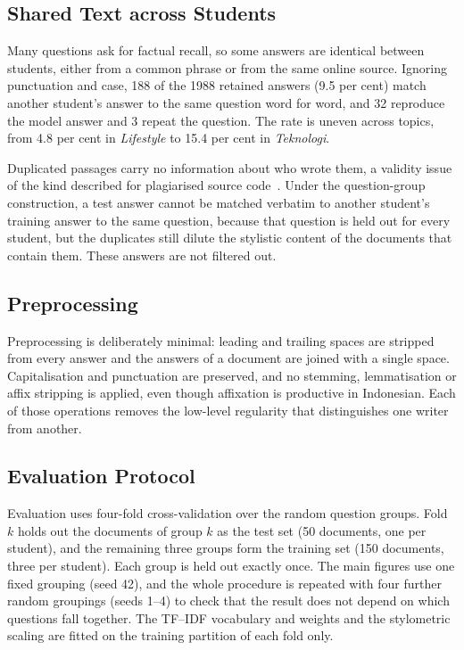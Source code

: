 \documentclass[runningheads]{llncs}
\begin{document}
\subsection{Shared Text across Students}
\label{sec:shared}

Many questions ask for factual recall, so some answers are identical between students, either from a common phrase or from the same online source. Ignoring punctuation and case, 188 of the 1988 retained answers (9.5 per cent) match another student's answer to the same question word for word, and 32 reproduce the model answer and 3 repeat the question. The rate is uneven across topics, from 4.8 per cent in \emph{Lifestyle} to 15.4 per cent in \emph{Teknologi}.

Duplicated passages carry no information about who wrote them, a validity issue of the kind described for plagiarised source code~\cite{Bogomolov2021}. Under the question-group construction, a test answer cannot be matched verbatim to another student's training answer to the same question, because that question is held out for every student, but the duplicates still dilute the stylistic content of the documents that contain them. These answers are not filtered out.

\subsection{Preprocessing}

Preprocessing is deliberately minimal: leading and trailing spaces are stripped from every answer and the answers of a document are joined with a single space. Capitalisation and punctuation are preserved, and no stemming, lemmatisation or affix stripping is applied, even though affixation is productive in Indonesian. Each of those operations removes the low-level regularity that distinguishes one writer from another.

\subsection{Evaluation Protocol}
\label{sec:protocol}

Evaluation uses four-fold cross-validation over the random question groups. Fold $k$ holds out the documents of group $k$ as the test set (50 documents, one per student), and the remaining three groups form the training set (150 documents, three per student). Each group is held out exactly once. The main figures use one fixed grouping (seed 42), and the whole procedure is repeated with four further random groupings (seeds 1--4) to check that the result does not depend on which questions fall together. The TF--IDF vocabulary and weights and the stylometric scaling are fitted on the training partition of each fold only.
\end{document}
